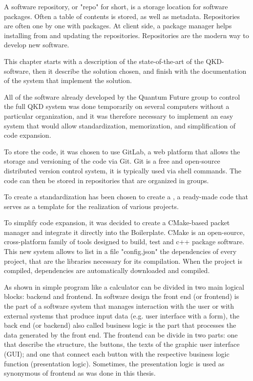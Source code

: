 A software repository, or "repo" for short, is a storage location for software packages. Often a table of contents is stored, as well as metadata. Repositories are often one by one with packages. At client side, a package manager helps installing from and updating the repositories. Repositories are the modern way to develop new software.

This chapter starts with a description of the state-of-the-art of the QKD-software, then it describe the solution chosen, and finish with the documentation of the system that implement the solution.

\newpage

All of the software already developed by the Quantum Future group to control the full QKD system was done temporarily on several computers without a particular organization, and it was therefore necessary to implement an easy system that would allow standardization, memorization, and simplification of code expansion.

To store the code, it was chosen to use GitLab, a web platform that allows the storage and versioning of the code via Git. Git is a free and open-source distributed version control system, it is typically used via shell commands.
The code can then be stored in repositories that are organized in groups.

To create a standardization has been chosen to create a , a ready-made code that serves as a template for the realization of various projects.

To simplify code expansion, it was decided to create a CMake-based packet manager and integrate it directly into the Boilerplate. CMake is an open-source, cross-platform family of tools designed to build, test and c++ package software.
This new system allows to list in a file "config.json" the dependencies of every project, that are the libraries necessary for its compilation.
When the project is compiled, dependencies are automatically downloaded and compiled.

As shown in  simple program like a calculator can be divided in two main logical blocks: backend and frontend.
In software design the front end (or frontend) is the part of a software system that manages interaction with the user or with external systems that produce input data (e.g. user interface with a form), the back end (or backend) also called business logic is the part that processes the data generated by the front end. The frontend can be divide in two parts: one that describe the structure, the buttons, the texts of the graphic user interface (GUI); and one that connect each button with the respective business logic function (presentation logic). Sometimes, the presentation logic is used as synonymous of frontend as was done in this thesis.

